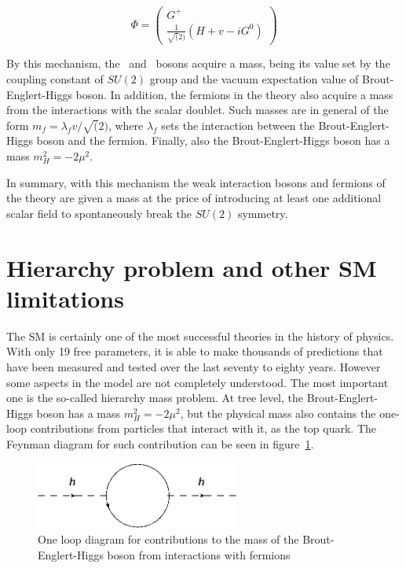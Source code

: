 \begin{equation}
  \label{eq:TransHiggsDoublet}
  \Phi=\left(
    \begin{array}{c}
      G^{+} \\
      \frac{1}{\sqrt(2)}(H+v-iG^{0})
    \end{array}
  \right)
\end{equation}

By this mechanism, the \W~and \Z~bosons acquire a mass, being its value set by the coupling constant of $SU(2)$ group and the vacuum expectation value of Brout-Englert-Higgs boson. In addition, the fermions in the theory also acquire a mass from the interactions with the scalar doublet. Such masses are in general of the form $m_{f}=\lambda_{f}v/\sqrt(2)$, where $\lambda_{f}$ sets the interaction between the Brout-Englert-Higgs boson and the fermion. Finally, also the Brout-Englert-Higgs boson has a mass $m_{H}^{2}=-2\mu^{2}$.

In summary, with this mechanism the weak interaction bosons and fermions of the theory are given a mass at the price of introducing at least one additional scalar field to spontaneously break the $SU(2)$ symmetry.

\section{Hierarchy problem and other SM limitations}
\label{sec:hier}

The SM is certainly one of the most successful theories in the history of physics. With only 19 free parameters, it is able to make thousands of predictions that have been measured and tested over the last seventy to eighty years. However some aspects in the model are not completely understood. The most important one is the so-called hierarchy mass problem. At tree level, the Brout-Englert-Higgs boson has a mass $m_{H}^{2}=-2\mu^{2}$, but the physical mass also contains the one-loop contributions from particles that interact with it, as the top quark. The Feynman diagram for such contribution can be seen in figure~\ref{fig:oneloophiggs}.

\begin{figure}[!Hhtbp]
  \begin{center}
    \includegraphics[width=0.6\textwidth]{figs/HierarchyLoop.png}
    \caption{One loop diagram for contributions to the mass of the Brout-Englert-Higgs boson from interactions with fermions}
    \label{fig:oneloophiggs}
  \end{center}
\end{figure}

